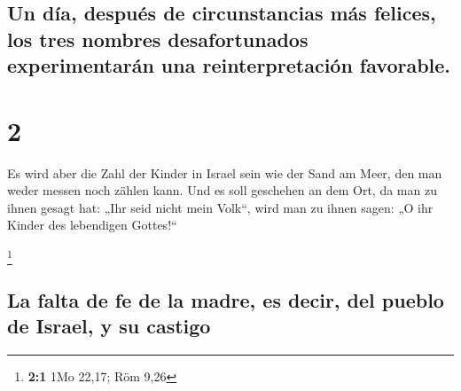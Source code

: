 \hypertarget{un-duxeda-despuuxe9s-de-circunstancias-muxe1s-felices-los-tres-nombres-desafortunados-experimentaruxe1n-una-reinterpretaciuxf3n-favorable.}{%
\subsection{Un día, después de circunstancias más felices, los tres
nombres desafortunados experimentarán una reinterpretación
favorable.}\label{un-duxeda-despuuxe9s-de-circunstancias-muxe1s-felices-los-tres-nombres-desafortunados-experimentaruxe1n-una-reinterpretaciuxf3n-favorable.}}

\hypertarget{section-1}{%
\section{2}\label{section-1}}

 Es wird aber die Zahl der Kinder in Israel sein wie der
Sand am Meer, den man weder messen noch zählen kann. Und es soll
geschehen an dem Ort, da man zu ihnen gesagt hat: „Ihr seid nicht mein
Volk``, wird man zu ihnen sagen: „O ihr Kinder des lebendigen
Gottes!{}``

\footnote{\textbf{2:1} 1Mo 22,17; Röm 9,26}

\hypertarget{la-falta-de-fe-de-la-madre-es-decir-del-pueblo-de-israel-y-su-castigo}{%
\subsection{La falta de fe de la madre, es decir, del pueblo de Israel,
y su
castigo}\label{la-falta-de-fe-de-la-madre-es-decir-del-pueblo-de-israel-y-su-castigo}}

